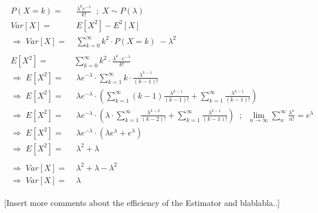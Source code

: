 \begin{align}
    \begin{split}
        P(X=k) =& \; \frac{\lambda^k e^{-\lambda}}{k!} \;\; ; \; X \sim P(\lambda) \\
        Var[X] =& \; E[X^2] - E^2[X] \\
        \Rightarrow \; Var[X] =& \; \sum_{k=0}^{\infty} k^2 \cdot P(X=k) \; - \lambda^2 \\ \\
        E[X^2] =& \sum_{k=0}^{\infty} k^2 \cdot \frac{\lambda^k \cdot e^{-\lambda}}{k!} \\
        \Rightarrow \; E[X^2] =& \; \lambda e^{-\lambda} \cdot \sum_{k=1}^{\infty} k \cdot \frac{\lambda^{k-1}}{(k-1)!} \\
        \Rightarrow \; E[X^2] =& \; \lambda e^{-\lambda} \cdot \left( \sum_{k=1}^{\infty} (k-1) \frac{\lambda^{k-1}}{(k-1)!} + \sum_{k=1}^{\infty} \frac{\lambda^{k-1}}{(k-1)!} \right) \\
        \Rightarrow \; E[X^2] =& \; \lambda e^{-\lambda} \cdot \left( \lambda \cdot \sum_{k=1}^{\infty} \frac{\lambda^{k-2}}{(k-2)!} + \sum_{k=1}^{\infty} \frac{\lambda^{k-1}}{(k-1)!} \right) \;\; ; \;\; \lim_{n \to \infty} \sum_{n}^{\infty} \frac{\lambda^n}{n!} = e^{\lambda} \\
        \Rightarrow \; E[X^2] =& \; \lambda e^{-\lambda} \cdot (\lambda e^{\lambda} + e^{\lambda}) \\
        \Rightarrow \; E[X^2] =& \; \lambda^2 + \lambda \\ \\
        \Rightarrow \; Var[X] =& \; \lambda^2 + \lambda - \lambda^2 \\
        \Rightarrow \; Var[X] =& \; \lambda
    \end{split}
\end{align}

[Insert more comments about the efficiency of the Estimator and blablabla..]